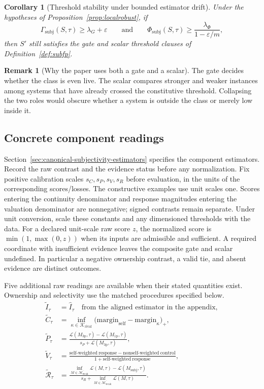 \documentclass[11pt,a4paper]{article}
\newtheorem{corollary}[theorem]{Corollary}
\theoremstyle{definition}
\newtheorem{remark}[theorem]{Remark}
\newcommand{\WeakFam}{\mathcal{M}_{\mathrm{weak}}}
\newcommand{\WeakClosure}{\overline{\WeakFam}}
\newcommand{\SelfIndex}{I}
\newcommand{\ContField}{C}
\newcommand{\Persp}{P}
\newcommand{\ValAsym}{V}
\newcommand{\Irred}{\mathcal{R}}
\newcommand{\GateSubj}{\Gamma_{\mathrm{subj}}}
\newcommand{\PhiSubj}{\Phi_{\mathrm{subj}}}
\newcommand{\Loss}{\mathcal{L}}
\begin{document}
\begin{corollary}[Threshold stability under bounded estimator drift]\label{cor:thresholdrobust}
Under the hypotheses of Proposition~\ref{prop:localrobust}, if
\[
\GateSubj(S,\tau)\ge \lambda_G+\varepsilon
\qquad\text{and}\qquad
\PhiSubj(S,\tau)\ge \frac{\lambda_\Phi}{1-\varepsilon/m},
\]
then $S'$ still satisfies the gate and scalar threshold clauses of Definition~\ref{def:subfp}.
\end{corollary}

\begin{remark}[Why the paper uses both a gate and a scalar]
The gate decides whether the class is even live. The scalar compares stronger and weaker instances among systems that have already crossed the constitutive threshold. Collapsing the two roles would obscure whether a system is outside the class or merely low inside it.
\end{remark}

\subsection{Concrete component readings}
Section~\ref{sec:canonical-subjectivity-estimators} specifies the component estimators. Record the raw contrast and the evidence status before any normalization. Fix positive calibration scales $s_C,s_P,s_V,s_R$ before evaluation, in the units of the corresponding scores/losses. The constructive examples use unit scales one. Scores entering the continuity denominator and response magnitudes entering the valuation denominator are nonnegative; signed contrasts remain separate. Under unit conversion, scale these constants and any dimensioned thresholds with the data. For a declared unit-scale raw score $z$, the normalized score is $\min(1,\max(0,z))$ when its inputs are admissible and sufficient. A required coordinate with insufficient evidence leaves the composite gate and scalar undefined. In particular a negative ownership contrast, a valid tie, and absent evidence are distinct outcomes.

Five additional raw readings are available when their stated quantities exist. Ownership and selectivity use the matched procedures specified below.
\begin{align*}
\widetilde{\SelfIndex}_\tau &= \widehat{\SelfIndex}_\tau\quad\text{from the aligned estimator in the appendix},\\
\widetilde{\ContField}_\tau &= \inf_{\kappa\in\mathcal{K}_{\mathrm{rival}}}\big(\mathrm{margin}_{\mathrm{self}}-\mathrm{margin}_{\kappa}\big)_+,\\
\widetilde{\Persp}_\tau &= \frac{\Loss(M_{\mathrm{3p}},\tau)-\Loss(M_{\mathrm{1p}},\tau)}{s_P+\Loss(M_{\mathrm{3p}},\tau)},\\
\widetilde{\ValAsym}_\tau &= \frac{\mathrm{self\text{-}weighted\ response}-\mathrm{nonself\text{-}weighted\ control}}{1+\mathrm{self\text{-}weighted\ response}},\\
\widetilde{\Irred}_\tau &= \frac{\inf_{M\in\WeakClosure}\Loss(M,\tau)-\Loss(M_{\mathrm{subj}},\tau)}{s_R+\inf_{M\in\WeakClosure}\Loss(M,\tau)}.
\end{align*}
\end{document}
